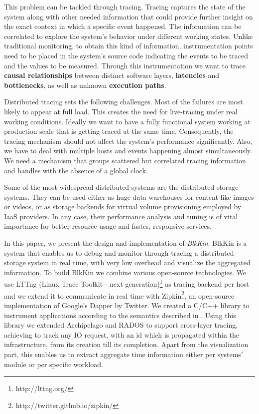 \documentclass[11pt,journal,compsoc]{IEEEtran}
\begin{document}
This problem can be tackled through tracing. Tracing captures the state of the
system along with other needed information that could provide further insight
on the exact context in which a specific event happened. The information can be
correlated to explore the system's behavior under different working states.
Unlike traditional monitoring, to obtain this kind of information,
instrumentation points need to be placed in the system's source code indicating
the events to be traced and the values to be measured. Through this
instrumentation we want to trace \textbf{causal relationships} between distinct
software layers, \textbf{latencies} and \textbf{bottlenecks}, as well as
unknown \textbf{execution paths}.

Distributed tracing sets the following challenges. Most of the failures are most
likely to appear at full load. This creates the need for live-tracing under real
working conditions. Ideally we want to have a fully functional system working at
production scale that is getting traced at the same time. Consequently, the
tracing mechanism should not affect the system's performance significantly.
Also, we have to deal with multiple hosts and events happening almost
simultaneously. We need a mechanism that groups scattered but correlated tracing
information and handles with the absence of a global clock.

Some of the most widespread distributed systems are the distributed storage
systems. They can be used either as huge data warehouses for content like images
or videos, or as storage backends for virtual volume provisioning employed by
IaaS providers. In any case, their performance analysis and tuning is of vital
importance for better resource usage and faster, responsive services.

In this paper, we present the design and implementation of \emph{BlkKin}.
BlkKin is a system that enables us to debug and monitor through tracing a
distributed storage system in real time, with very low overhead and visualize
the aggregated information. To build BlkKin we combine various open-source
technologies. We use LTTng (Linux Trace Toolkit - next
generation)\footnote{http://lttng.org/} as tracing backend per host and we
extend it to communicate in real time with
Zipkin\footnote{http://twitter.github.io/zipkin/}, an open-source
implementation of Google's Dapper\cite{dapper} by Twitter. We created a C/C++
library to instrument applications according to the semantics described in
\cite{dapper}. Using this library we extended Archipelago\cite{archip} and
RADOS\cite{rados} to support cross-layer tracing, achieving to track any IO
request, with an id which is propagated within the infrastructure, from its
creation till its completion. Apart from the visualization part, this enables
us to extract aggregate time information either per systems' module or per
specific workload.
\end{document}

